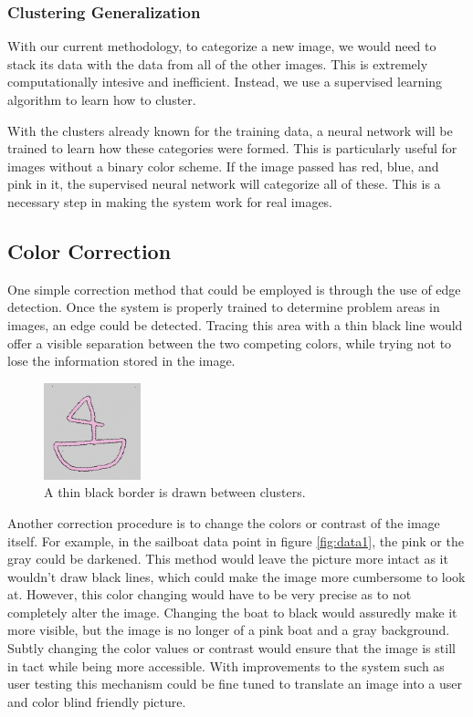 \documentclass[12pt]{article}
\begin{document}
\begin{multicols}{2}
\subsubsection{Clustering Generalization}
With our current methodology, to categorize a new image, we would need to stack its data with the data from all of the other images. This is extremely computationally intesive and inefficient. Instead, we use a supervised learning algorithm to learn how to cluster.

With the clusters already known for the training data, a neural network will be trained to learn how these categories were formed. This is particularly useful for images without a binary color scheme. If the image passed has red, blue, and pink in it, the supervised neural network will categorize all of these. This is a necessary step in making the system work for real images.



\subsection{Color Correction}

One simple correction method that could be employed is through the use of edge detection. Once the system is properly trained to determine problem areas in images, an edge could be detected. Tracing this area with a thin black line would offer a visible separation between the two competing colors, while trying not to lose the information stored in the image.

\begin{figure}[H]
	\centering
	\includegraphics[width=0.25\textwidth]{img/noise_data2_border.png}
	\caption{A thin black border is drawn between clusters.}
	\label{fig:border1}
\end{figure}

Another correction procedure is to change the colors or contrast of the image itself. For example, in the sailboat data point in figure \ref{fig:data1}, the pink or the gray could be darkened. This method would leave the picture more intact as it wouldn't draw black lines, which could make the image more cumbersome to look at. However, this color changing would have to be very precise as to not completely alter the image. Changing the boat to black would assuredly make it more visible, but the image is no longer of a pink boat and a gray background. Subtly changing the color values or contrast would ensure that the image is still in tact while being more accessible. With improvements to the system such as user testing this mechanism could be fine tuned to translate an image into a user and color blind friendly picture.



\end{multicols}
\end{document}
